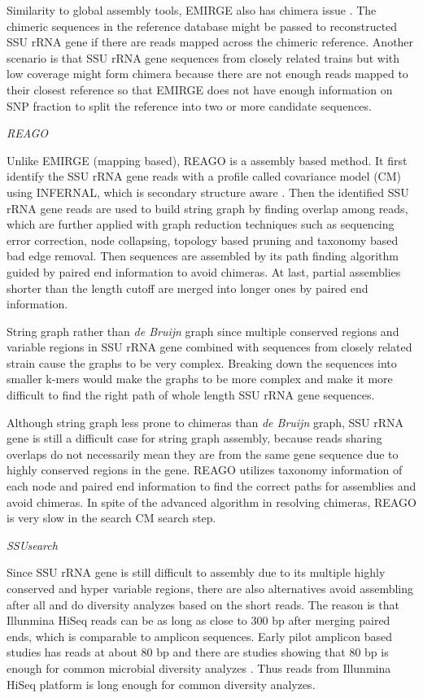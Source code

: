 \documentclass[]{msu-thesis}
\begin{document}
Similarity to global assembly tools, EMIRGE also has chimera issue
\cite{rajeev_dynamic_2013}. The chimeric sequences in the reference
database might be passed to reconstructed SSU rRNA gene if there are
reads mapped across the chimeric reference. Another scenario is that
SSU rRNA gene sequences from closely related trains but with low
coverage might form chimera because there are not enough reads mapped
to their closest reference so that EMIRGE does not have enough
information on SNP fraction to split the reference into two or more
candidate sequences.

\textit{REAGO}

Unlike EMIRGE (mapping based), REAGO is a assembly based method. It
first identify the SSU rRNA gene reads with a profile called
covariance model (CM) using INFERNAL, which is secondary structure
aware \cite{nawrocki_infernal_2009}. Then the identified SSU rRNA gene
reads are used to build string graph by finding overlap among reads,
which are further applied with graph reduction techniques such as
sequencing error correction, node collapsing, topology based pruning
and taxonomy based bad edge removal. Then sequences are assembled by
its path finding algorithm guided by paired end information to avoid
chimeras. At last, partial assemblies shorter than the length cutoff
are merged into longer ones by paired end information.

String graph rather than \textit{de Bruijn} graph since multiple
conserved regions and variable regions in SSU rRNA gene combined with
sequences from closely related strain cause the graphs to be very
complex. Breaking down the sequences into smaller k-mers would make
the graphs to be more complex and make it more difficult to find the
right path of whole length SSU rRNA gene sequences.

Although string graph less prone to chimeras than \textit{de Bruijn}
graph, SSU rRNA gene is still a difficult case for string graph
assembly, because reads sharing overlaps do not necessarily mean they
are from the same gene sequence due to highly conserved regions in the
gene. REAGO utilizes taxonomy information of each node and paired end
information to find the correct paths for assemblies and avoid
chimeras. In spite of the advanced algorithm in resolving chimeras,
REAGO is very slow in the search CM search step.

\textit{SSUsearch}

Since SSU rRNA gene is still difficult to assembly due to its multiple
highly conserved and hyper variable regions, there are also
alternatives avoid assembling after all and do diversity analyzes
based on the short reads. The reason is that Illunmina HiSeq reads can
be as long as close to 300 bp after merging paired ends, which is
comparable to amplicon sequences. Early pilot amplicon based studies
has reads at about 80 bp and there are studies showing that 80 bp is
enough for common microbial diversity analyzes
\cite{sogin_microbial_2006}. Thus reads from Illunmina HiSeq platform
is long enough for common diversity analyzes.
\end{document}
